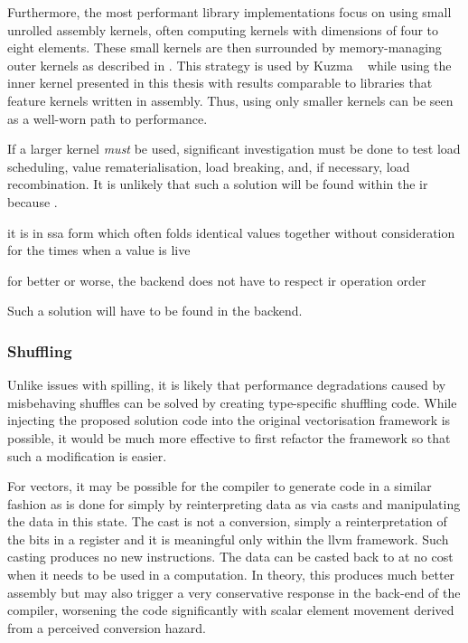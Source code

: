 \documentclass[\main/thesis.tex]{subfiles}
\begin{document}
Furthermore, the most performant library implementations focus on using small unrolled assembly kernels, often computing kernels with dimensions of four to eight elements.
These small kernels are then surrounded by memory-managing outer kernels as described in .
This strategy is used by Kuzma \etal~\autocite{kuzma2021fast} while using the inner kernel presented in this thesis with results comparable to libraries that feature kernels written in assembly.
Thus, using only smaller kernels can be seen as a well-worn path to performance.

If a larger kernel \emph{must} be used, significant investigation must be done to test load scheduling, value \gls{rematerialisation}, load breaking, and, if necessary, load recombination.
It is unlikely that such a solution will be found within the \gls{ir} because .
\begin{enumerate*}[itemjoin={{; }}, itemjoin*={{; and }}, label=(\arabic*), after={.}]
  \item it is in \gls{ssa} form which often folds identical values together without consideration for the times when a value is \gls{live}
  \item for better or worse, the backend does not have to respect \gls{ir} operation order
\end{enumerate*}
Such a solution will have to be found in the backend.

\subsubsection{Shuffling}
Unlike issues with spilling, it is likely that performance degradations caused by misbehaving shuffles can be solved by creating type-specific shuffling code.
While injecting the proposed solution code into the original vectorisation framework is possible, it would be much more effective to first refactor the framework so that such a modification is easier.

For  vectors, it may be possible for the compiler to generate code in a similar fashion as is done for  simply by reinterpreting data as  via casts and manipulating the data in this state.
The cast is not a conversion, simply a reinterpretation of the bits in a register and it is meaningful only within the \gls{llvm} framework.
Such casting produces no new instructions.
The data can be casted back to  at no cost when it needs to be used in a computation.
In theory, this produces much better assembly but may also trigger a very conservative response in the back-end of the compiler, worsening the code significantly with scalar element movement derived from a perceived conversion hazard.
\end{document}
